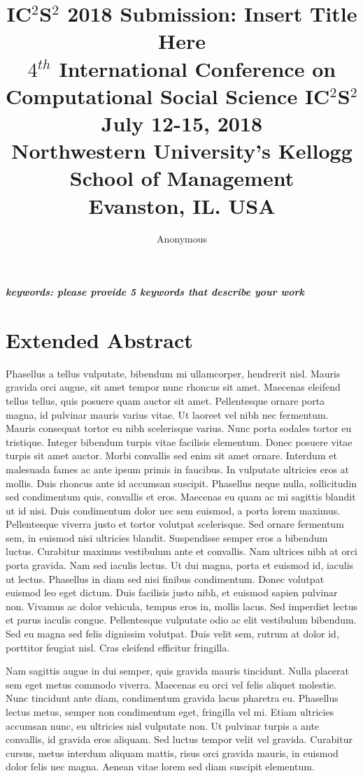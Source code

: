 \documentclass[a4paper,12pt]{article}
\title{IC$^{2}$S$^{2}$ 2018 Submission: Insert Title Here \\
	\normalsize $4$$^{th}$ International Conference on Computational Social Science IC$^{2}$S$^{2}$ \\
	\normalsize July 12-15, 2018 \\
	\normalsize Northwestern University’s Kellogg School of Management \\
	\normalsize Evanston, IL. USA
}
\author[1]{Anonymous} %
\date{}
\begin{document}
\maketitle

\vspace{-2em}

\begin{center}
\textbf{\textit{keywords: please provide 5 keywords that describe your work}}
\newline
\end{center}


\section{Extended Abstract}
Phasellus a tellus vulputate, bibendum mi ullamcorper, hendrerit nisl. Mauris gravida orci augue, sit amet tempor nunc rhoncus sit amet. Maecenas eleifend tellus tellus, quis posuere quam auctor sit amet. Pellentesque ornare porta magna, id pulvinar mauris varius vitae. Ut laoreet vel nibh nec fermentum. Mauris consequat tortor eu nibh scelerisque varius. Nunc porta sodales tortor eu tristique. Integer bibendum turpis vitae facilisis elementum. Donec posuere vitae turpis sit amet auctor. Morbi convallis sed enim sit amet ornare. Interdum et malesuada fames ac ante ipsum primis in faucibus. In vulputate ultricies eros at mollis. Duis rhoncus ante id accumsan suscipit. Phasellus neque nulla, sollicitudin sed condimentum quis, convallis et eros. Maecenas eu quam ac mi sagittis blandit ut id nisi. Duis condimentum dolor nec sem euismod, a porta lorem maximus. 
Pellentesque viverra justo et tortor volutpat scelerisque. Sed ornare fermentum sem, in euismod nisi ultricies blandit. Suspendisse semper eros a bibendum luctus. Curabitur maximus vestibulum ante et convallis. Nam ultrices nibh at orci porta gravida. Nam sed iaculis lectus. Ut dui magna, porta et euismod id, iaculis ut lectus. Phasellus in diam sed nisi finibus condimentum. Donec volutpat euismod leo eget dictum. Duis facilisis justo nibh, et euismod sapien pulvinar non. Vivamus ac dolor vehicula, tempus eros in, mollis lacus. Sed imperdiet lectus et purus iaculis congue. Pellentesque vulputate odio ac elit vestibulum bibendum. Sed eu magna sed felis dignissim volutpat. Duis velit sem, rutrum at dolor id, porttitor feugiat nisl. Cras eleifend efficitur fringilla. 


Nam sagittis augue in dui semper, quis gravida mauris tincidunt. Nulla placerat sem eget metus commodo viverra. Maecenas eu orci vel felis aliquet molestie. Nunc tincidunt ante diam, condimentum gravida lacus pharetra eu. Phasellus lectus metus, semper non condimentum eget, fringilla vel mi. Etiam ultricies accumsan nunc, eu ultricies nisl vulputate non. Ut pulvinar turpis a ante convallis, id gravida eros aliquam. Sed luctus tempor velit vel gravida. Curabitur cursus, metus interdum aliquam mattis, risus orci gravida mauris, in euismod dolor felis nec magna. Aenean vitae lorem sed diam suscipit elementum. 
\end{document}
